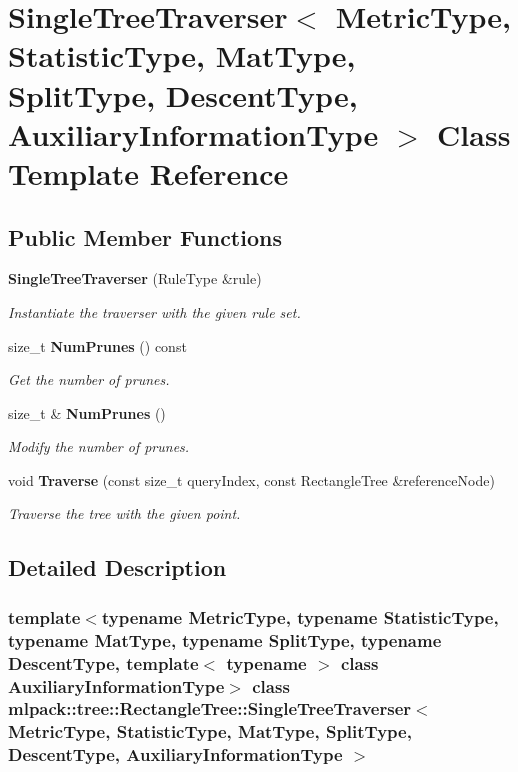 \section{Single\+Tree\+Traverser$<$ Metric\+Type, Statistic\+Type, Mat\+Type, Split\+Type, Descent\+Type, Auxiliary\+Information\+Type $>$ Class Template Reference}
\label{classmlpack_1_1tree_1_1RectangleTree_1_1SingleTreeTraverser}
\subsection*{Public Member Functions}
\begin{DoxyCompactItemize}
\item 
\textbf{ Single\+Tree\+Traverser} (Rule\+Type \&rule)
\begin{DoxyCompactList}\small\item\em Instantiate the traverser with the given rule set. \end{DoxyCompactList}\item 
size\+\_\+t \textbf{ Num\+Prunes} () const
\begin{DoxyCompactList}\small\item\em Get the number of prunes. \end{DoxyCompactList}\item 
size\+\_\+t \& \textbf{ Num\+Prunes} ()
\begin{DoxyCompactList}\small\item\em Modify the number of prunes. \end{DoxyCompactList}\item 
void \textbf{ Traverse} (const size\+\_\+t query\+Index, const Rectangle\+Tree \&reference\+Node)
\begin{DoxyCompactList}\small\item\em Traverse the tree with the given point. \end{DoxyCompactList}\end{DoxyCompactItemize}


\subsection{Detailed Description}
\subsubsection*{template$<$typename Metric\+Type, typename Statistic\+Type, typename Mat\+Type, typename Split\+Type, typename Descent\+Type, template$<$ typename $>$ class Auxiliary\+Information\+Type$>$\newline
class mlpack\+::tree\+::\+Rectangle\+Tree\+::\+Single\+Tree\+Traverser$<$ Metric\+Type, Statistic\+Type, Mat\+Type, Split\+Type, Descent\+Type, Auxiliary\+Information\+Type $>$}



